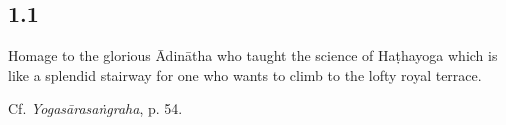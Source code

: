 

\pagestyle{HPed}
\begin{ekdosis}


\subsection*{1.1}
\begin{translation}[hp01_001]
Homage to the glorious Ādinātha who taught the science of Haṭhayoga which is like a splendid stairway for one who wants to climb to the lofty royal terrace.%

\end{translation}

\begin{testimonia}[hp01_001]
Cf. \emph{Yogasārasaṅgraha}, p. 54.

\begin{versinnote}
\end{versinnote}


\end{testimonia}
\end{ekdosis}
